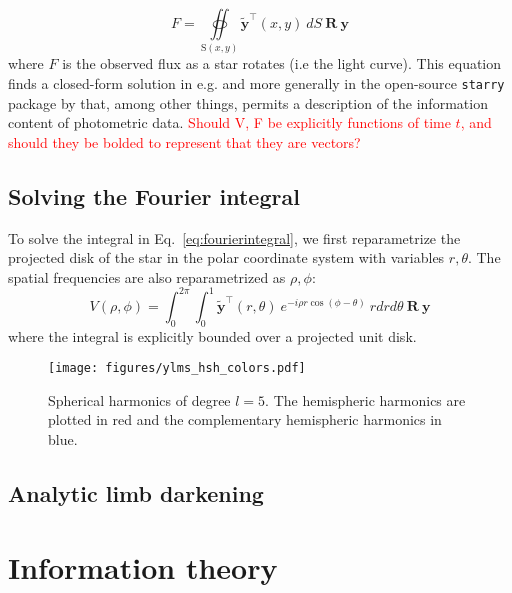\documentclass[modern]{aastex631}
\begin{document}
\begin{equation} \label{eq:fluxintegral}
   F = \oiint\limits_{\mathrm{S}(x,y)} \mathbf{\tilde{y}}^\top(x,y) \ dS \ \mathbf{R} \ \mathbf{y}
\end{equation}
where $F$ is the observed flux as a star rotates (i.e the light curve). This equation finds a closed-form solution in e.g. \citep{cowan2013} and more generally in the open-source \texttt{starry} package by \citep{starry2019} that, among other things, permits a description of the information content of photometric data.
\textcolor{red}{Should V, F be explicitly functions of time $t$, and should they be bolded to represent that they are vectors?}
\subsection{Solving the Fourier integral}

To solve the integral in Eq.~\ref{eq:fourierintegral}, we first reparametrize the projected disk of the star in the polar coordinate system with variables $r, \theta$. The spatial frequencies are also reparametrized as $\rho, \phi$:
\begin{equation} \label{eq:polarform}
   V(\rho,\phi) = \int_{0}^{2\pi}\int_{0}^{1} \mathbf{\tilde{y}}^\top(r, \theta) \ e^{-i\rho r\cos{(\phi-\theta)}} \ r dr d\theta \ \mathbf{R} \ \mathbf{y}
\end{equation} 
where the integral is explicitly bounded over a projected unit disk. 

\begin{figure}[ht!]
    \begin{centering}
        \texttt{[image: figures/ylms\_hsh\_colors.pdf]}
        \caption{
        Spherical harmonics of degree $l=5$. The hemispheric harmonics are plotted in red and the complementary hemispheric harmonics in blue.
        }
        \label{fig:pyramid}
    \end{centering}
\end{figure}

\subsection{Analytic limb darkening}

\section{Information theory}
\label{sec:infotheory}
\end{document}
